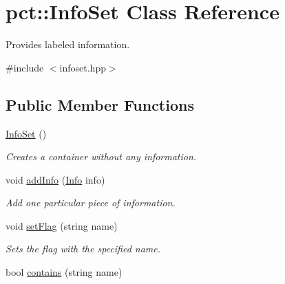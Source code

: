 \hypertarget{classpct_1_1_info_set}{\section{pct\-:\-:Info\-Set Class Reference}
\label{classpct_1_1_info_set}
}


Provides labeled information.  




{\ttfamily \#include $<$infoset.\-hpp$>$}

\subsection*{Public Member Functions}
\begin{DoxyCompactItemize}
\item 
\hypertarget{classpct_1_1_info_set_af60815077cca5f9de8a2fa5fb5424163}{\hyperlink{classpct_1_1_info_set_af60815077cca5f9de8a2fa5fb5424163}{Info\-Set} ()}\label{classpct_1_1_info_set_af60815077cca5f9de8a2fa5fb5424163}

\begin{DoxyCompactList}\small\item\em Creates a container without any information. \end{DoxyCompactList}\item 
void \hyperlink{classpct_1_1_info_set_a6daa0aeffdacaca7b466e8a8c79b60b8}{add\-Info} (\hyperlink{classpct_1_1_info}{Info} info)
\begin{DoxyCompactList}\small\item\em Add one particular piece of information. \end{DoxyCompactList}\item 
\hypertarget{classpct_1_1_info_set_a1f438cef60c6905e6ecf658f35bc8067}{void \hyperlink{classpct_1_1_info_set_a1f438cef60c6905e6ecf658f35bc8067}{set\-Flag} (string name)}\label{classpct_1_1_info_set_a1f438cef60c6905e6ecf658f35bc8067}

\begin{DoxyCompactList}\small\item\em Sets the flag with the specified name. \end{DoxyCompactList}\item 
\hypertarget{classpct_1_1_info_set_ac89b9f99c5323af0eb2f70d59c64515b}{bool \hyperlink{classpct_1_1_info_set_ac89b9f99c5323af0eb2f70d59c64515b}{contains} (string name)}\label{classpct_1_1_info_set_ac89b9f99c5323af0eb2f70d59c64515b}


\end{DoxyCompactItemize}
